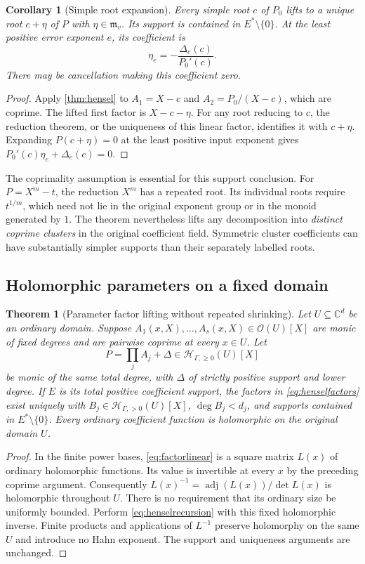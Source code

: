 \documentclass[11pt,letterpaper]{article}
\numberwithin{equation}{section}
\newtheorem{theorem}{Theorem}[section]
\newtheorem{corollary}[corollary]{Corollary}
\theoremstyle{definition}
\theoremstyle{remark}
\newcommand{\C}{\mathbb C}
\newcommand{\OO}{\mathcal O}
\newcommand{\mv}{\mathfrak m_v}
\begin{document}
\begin{corollary}[Simple root expansion]\label{cor:simpleroot}
Every simple root $c$ of $P_0$ lifts to a unique root $c+\eta$ of $P$
with $\eta\in\mv$. Its support is contained in $E^*\setminus\{0\}$.
At the least positive error exponent $e$, its coefficient is
\begin{equation}\label{eq:firstrootcorrection}
 \eta_e=-\frac{\Delta_e(c)}{P_0'(c)}.
\end{equation}
There may be cancellation making this coefficient zero.
\end{corollary}
\begin{proof}
Apply \cref{thm:hensel} to $A_1=X-c$ and $A_2=P_0/(X-c)$, which are
coprime. The lifted first factor is $X-c-\eta$. For any root reducing to
$c$, the reduction theorem, or the uniqueness of this linear factor,
identifies it with $c+\eta$. Expanding $P(c+\eta)=0$ at the least positive
input exponent gives
$P_0'(c)\eta_e+\Delta_e(c)=0$.
\end{proof}

The coprimality assumption is essential for this support conclusion.
For $P=X^m-t$, the reduction $X^m$ has a repeated root. Its individual
roots require $t^{1/m}$, which need not lie in the original exponent
group or in the monoid generated by $1$. The theorem nevertheless lifts
any decomposition into \emph{distinct coprime clusters} in the original
coefficient field. Symmetric cluster coefficients can have substantially
simpler supports than their separately labelled roots.

\subsection{Holomorphic parameters on a fixed domain}
\begin{theorem}[Parameter factor lifting without repeated shrinking]\label{thm:parameterhensel}
Let $U\subseteq\C^d$ be an ordinary domain. Suppose
$A_1(x,X),\ldots,A_s(x,X)\in\OO(U)[X]$ are monic of fixed degrees and are
pairwise coprime at every $x\in U$. Let
\[
 P=\prod_jA_j+\Delta\in\mathcal H_{\Gamma,\ge0}(U)[X]
\]
be monic of the same total degree, with $\Delta$ of strictly positive
support and lower degree. If $E$ is its total positive coefficient
support, the factors in \eqref{eq:henselfactors} exist uniquely with
$B_j\in\mathcal H_{\Gamma,>0}(U)[X]$, $\deg B_j<d_j$, and supports
contained in $E^*\setminus\{0\}$. Every ordinary coefficient function is
holomorphic on the \emph{original} domain $U$.
\end{theorem}
\begin{proof}
In the finite power bases, \eqref{eq:factorlinear} is a square matrix
$L(x)$ of ordinary holomorphic functions. Its value is invertible at every
$x$ by the preceding coprime argument. Consequently
$L(x)^{-1}=\operatorname{adj}(L(x))/\det L(x)$ is holomorphic throughout
$U$. There is no requirement that its ordinary size be uniformly bounded.
Perform \eqref{eq:henselrecursion} with this fixed holomorphic inverse.
Finite products and applications of $L^{-1}$ preserve holomorphy on the
same $U$ and introduce no Hahn exponent. The support and uniqueness
arguments are unchanged.
\end{proof}
\end{document}
